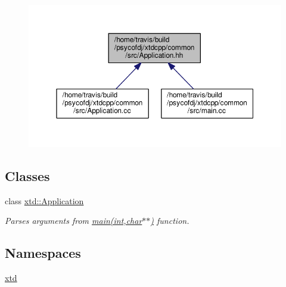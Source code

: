 \begin{figure}[H]
\begin{center}
\leavevmode
\includegraphics[width=350pt]{src_2Application_8hh__dep__incl}
\end{center}
\end{figure}
\subsection*{Classes}
\begin{DoxyCompactItemize}
\item 
class \hyperlink{classxtd_1_1Application}{xtd\-::\-Application}
\begin{DoxyCompactList}\small\item\em Parses arguments from \hyperlink{doc_2example_2Application_8hh_a6b77b2233054447db17959182b5fb02b}{main(int,char$\ast$$\ast$)} function. \end{DoxyCompactList}\end{DoxyCompactItemize}
\subsection*{Namespaces}
\begin{DoxyCompactItemize}
\item 
\hyperlink{namespacextd}{xtd}
\end{DoxyCompactItemize}
